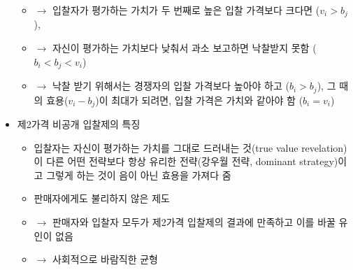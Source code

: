 \begin{itemize}
\begin{itemize}
	\item $\rightarrow$ 입찰자가 평가하는 가치가 두 번째로 높은 입찰 가격보다 크다면 ($v_{i} > b_{j}$),
	\item $\rightarrow$ 자신이 평가하는 가치보다 낮춰서 과소 보고하면 낙찰받지 못함 ($b_{i} < b_{j} < v_{i}$)
	\item $\rightarrow$ 낙찰 받기 위해서는 경쟁자의 입찰 가격보다 높아야 하고 ($b_{i} > b_{j}$), 그 때의 효용($v_{i} - b_{j}$)이 최대가 되려면, 입찰 가격은 가치와 같아야 함 ($b_{i} = v_{i} $) 
	\end{itemize}
\item 제2가격 비공개 입찰제의 특징 
	\begin{itemize}
	\item 입찰자는 자신이 평가하는 가치를 그대로 드러내는 것(true value revelation)이 다른 어떤 전략보다 항상 유리한 전략(강우월 전략, dominant strategy)이고 그렇게 하는 것이 음이 아닌 효용을 가져다 줌
	\item 판매자에게도 불리하지 않은 제도
	\item $\rightarrow$ 판매자와 입찰자 모두가 제2가격 입찰제의 결과에 만족하고 이를 바꿀 유인이 없음 
	\item $\rightarrow$ 사회적으로 바람직한 균형
	\end{itemize}
\end{itemize}


